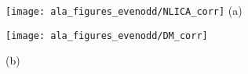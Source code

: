 \documentclass[]{article}
\begin{document}
\centering
\begin{minipage}{0.4\textwidth}
\centering
    \texttt{[image: ala\_figures\_evenodd/NLICA\_corr]}
    (a)
\end{minipage}
\begin{minipage}{0.4\textwidth}
\centering
\texttt{[image: ala\_figures\_evenodd/DM\_corr]}
    
(b)
\end{minipage}
\end{document}
